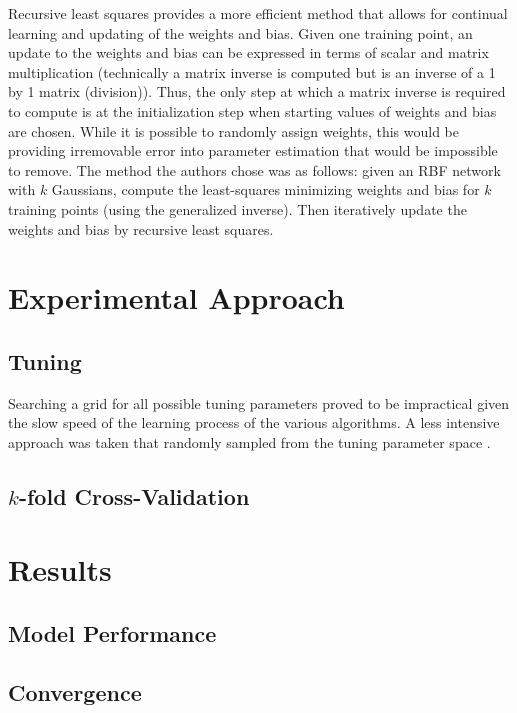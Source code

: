 \documentclass[conference]{IEEEtran}
\begin{document}
    Recursive least squares provides a more efficient method that allows for continual learning and updating of the weights and bias. Given one training point, an update to the weights and bias can be expressed in terms of scalar and matrix multiplication (technically a matrix inverse is computed but is an inverse of a 1 by 1 matrix (division)). Thus, the only step at which a matrix inverse is required to compute is at the initialization step when starting values of weights and bias are chosen. While it is possible to randomly assign weights, this would be providing irremovable error into parameter estimation that would be impossible to remove. The method the authors chose was as follows: given an RBF network with $k$ Gaussians, compute the least-squares minimizing weights and bias for $k$ training points (using the generalized inverse). Then iteratively update the weights and bias by recursive least squares.
    
\section{Experimental Approach}
  \subsection{Tuning}
  Searching a grid for all possible tuning parameters proved to be impractical given the slow speed of the learning process of the various algorithms. A less intensive approach was taken that randomly sampled from the tuning parameter space \cite{bergstra}.
  
  \subsection{$k$-fold Cross-Validation}

\section{Results}
  \subsection{Model Performance}

  \subsection{Convergence}
  
\end{document}
